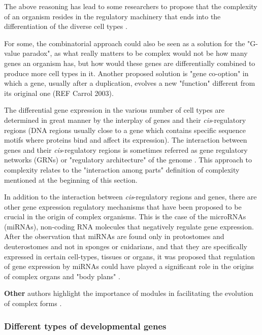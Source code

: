 The above reasoning has lead to some researchers to propose that the complexity of an organism resides in the regulatory machinery that ends into the differentiation of the diverse cell types \citep{Davidson2001}. 

For some, the combinatorial approach could also be seen as a solution for the "G-value paradox", as what really matters to be complex would not be how many genes an organism has, but how would these genes are differentially combined to produce more cell types in it. Another proposed solution is "gene co-option" in which a gene, usually after a duplication, evolves a new "function" different from its original one (REF Carrol 2003).

The differential gene expression in the various number of cell types are determined in great manner by the interplay of genes and their \textit{cis}-regulatory regions (DNA regions usually close to a gene which contains specific sequence motifs where proteins bind and affect its expression). The interaction between genes and their \textit{cis}-regulatory regions is sometimes referred as gene regulatory networks (GRNs) or "regulatory architecture" of the genome \citep{Davidson2001}.
This approach to complexity relates to the "interaction among parts" definition of complexity mentioned at the beginning of this section.

In addition to the interaction between \textit{cis}-regulatory regions and genes, there are other gene expression regulatory mechanisms that have been proposed to be crucial in the origin of complex organisms.
This is the case of the microRNAs (miRNAs),
non-coding RNA molecules that negatively regulate gene expression.
After the observation that miRNAs are found only in protostomes and deuterostomes and not in sponges or cnidarians, and that they are specifically expressed in certain cell-types, tissues or organs, it was proposed that regulation of gene expression by miRNAs could have played a significant role in the origins of complex organs and "body plans" \citep{Sempere2006}.

\textbf{Other} authors highlight the importance of modules in facilitating the evolution of complex forms \citep{Carroll2001a}.


\subsubsection{Different types of developmental genes}

